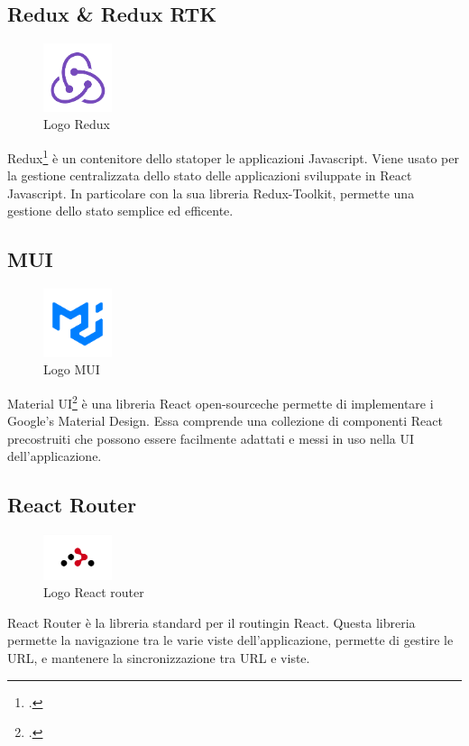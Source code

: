 \subsection*{Redux \& Redux RTK}
\begin{figure}[H]
  \centering
  \includegraphics[width=2cm]{immagini/logo-redux.png}
  \caption{Logo Redux}
\end{figure}
Redux\footcite{site:redux} è un contenitore dello \gls{stato}\glsfirstoccur per le applicazioni Javascript. Viene usato per la gestione centralizzata dello stato delle applicazioni sviluppate in React Javascript.
In particolare con la sua libreria Redux-Toolkit, permette una gestione dello stato semplice ed efficente.

\subsection*{MUI}
\begin{figure}[H]
  \centering
  \includegraphics[width=2cm]{immagini/logo-MUI.png}
  \caption{Logo MUI}
\end{figure}
Material UI\footcite{site:mui} è una libreria React \gls{open-source}\glsfirstoccur che permette di implementare i Google's Material Design. Essa comprende una collezione di componenti React precostruiti che possono
essere facilmente adattati e messi in uso nella UI dell'applicazione.

\subsection*{React Router}
\begin{figure}[H]
  \centering
  \includegraphics[width=2cm]{immagini/logo-recact-router.png}
  \caption{Logo React router}
\end{figure}
React Router è la libreria standard per il \gls{routing}\glsfirstoccur in React. Questa libreria permette la navigazione tra le varie viste dell'applicazione, permette di gestire le \gls{URL}\glsfirstoccur, e mantenere
la sincronizzazione tra URL e viste.
\newpage
